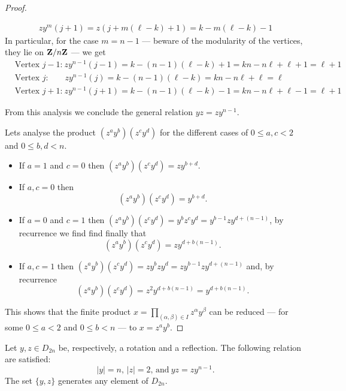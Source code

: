 \begin{proof}
\begin{itemize}
\begin{gather*}
        z y^m(j + 1) = z(j + m (\ell - k) + 1) = k - m (\ell - k) - 1
      \end{gather*}
      In particular, for the case \(m = n - 1\) --- beware of the modularity of
      the vertices, they lie on \(\mathbf{Z}/n\mathbf{Z}\) --- we get
      \begin{align*}
        &\text{Vertex } j - 1\text{:}\
        zy^{n-1}(j - 1)
        = k - (n - 1) (\ell - k) + 1
        = k n - n \ell + \ell + 1
        = \ell + 1
        \\
        &\text{Vertex } j\text{:} \qquad
        zy^{n-1}(j)
        = k - (n - 1) (\ell - k)
        = kn - n \ell + \ell
        = \ell
        \\
        &\text{Vertex } j + 1\text{:}\
        zy^{n-1}(j + 1)
        = k - (n - 1) (\ell - k) - 1
        = k n - n \ell + \ell - 1
        = \ell + 1
      \end{align*}
  \end{itemize}
  From this analysis we conclude the general relation \(y z = z y^{n-1}\).

  Lets analyse the product \((z^a y^b)(z^c y^d)\) for the different cases of \(0
  \leq a, c < 2\) and \(0 \leq b, d < n\).
  \begin{itemize}
    \item If \(a = 1\) and \(c = 0\) then \((z^a y^b)(z^c y^d) = z y^{b + d}\).
    \item If \(a, c = 0\) then
      \[
        (z^a y^b)(z^c y^d) = y^{b + d}.
      \]
    \item If \(a = 0\) and \(c = 1\) then \((z^a y^b)(z^c y^d) = y^b z^c y^d =
      y^{b-1} z y^{d + (n - 1)}\), by recurrence we find find finally that
      \[
        (z^a y^b)(z^c y^d) = z y^{d + b(n - 1)}.
      \]
    \item If \(a, c = 1\) then \((z^a y^b)(z^c y^d) = z y^b z y^d = z y^{b-1} z
      y^{d + (n - 1)}\) and, by recurrence
      \[
        (z^a y^b)(z^c y^d) = z^2 y^{d + b(n - 1)} = y^{d + b(n - 1)}.
      \]
  \end{itemize}
  This shows that the finite product \(x = \prod_{(\alpha, \beta) \in I}
  z^\alpha y^\beta\) can be reduced --- for some \(0 \leq a < 2\) and \(0 \leq b
  < n\) --- to \(x = z^a y^b\).
\end{proof}

\begin{corollary}
  Let \(y, z \in D_{2n}\) be, respectively, a rotation and a reflection. The
  following relation are satisfied:
  \[
    |y| = n \text{, } |z| = 2 \text{, and}\ yz = z y^{n-1}.
  \]
  The set \(\{y, z\}\) generates any element of \(D_{2n}\).
\end{corollary}

